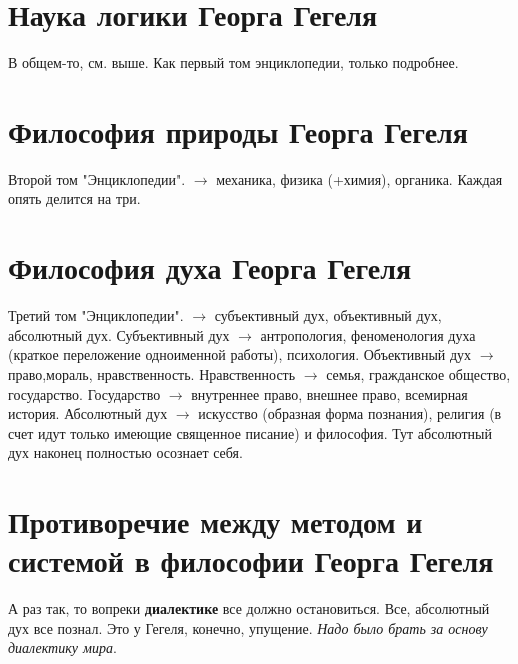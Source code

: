 \section{Наука логики Георга Гегеля}
В общем-то, см. выше. Как первый том энциклопедии, только подробнее.

\section{Философия природы Георга Гегеля}
Второй том "Энциклопедии". $\rightarrow$ механика, физика (+химия), органика. Каждая опять делится на три.

\section{Философия духа Георга Гегеля}
Третий том "Энциклопедии". $\rightarrow$ субъективный дух, объективный дух, абсолютный дух.
Субъективный дух $\rightarrow$  антропология, феноменология духа (краткое переложение одноименной работы), психология. Объективный дух  $\rightarrow$ право,мораль, нравственность. Нравственность $\rightarrow$ семья, гражданское общество, государство. Государство $\rightarrow$ внутреннее право, внешнее право, всемирная история. Абсолютный дух $\rightarrow$ искусство (образная форма познания), религия (в счет идут только имеющие священное писание) и философия. Тут абсолютный дух наконец полностью осознает себя.

\section{Противоречие между методом и системой в философии Георга Гегеля}
А раз так, то вопреки \textbf{диалектике} все должно остановиться. Все, абсолютный дух все познал. Это у Гегеля, конечно, упущение. \textit{Надо было брать за основу диалектику мира}.

